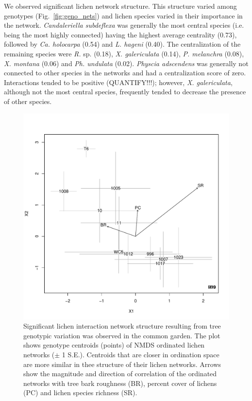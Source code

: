 \documentclass[9pt,twocolumn,twoside,lineno]{pnas-new}
\begin{document}
{We observed significant lichen network structure. This structure
varied among genotypes (Fig.~\ref{fig:geno_nets}) and lichen species
varied in their importance in the network. \textit{Candaleriella
  subdeflexa} was generally the most central species (i.e. being the
most highly connected) having the highest average centrality (0.73),
followed by \textit{Ca. holocarpa} (0.54) and \textit{L. hageni}
(0.40). The centralization of the remaining species were \textit{R.}
sp. (0.18), \textit{X. galericulata} (0.14), \textit{P. melanchra}
(0.08), \textit{X. montana} (0.06) and \textit{Ph. undulata}
(0.02). \textit{Physcia adscendens} was generally not connected to
other species in the networks and had a centralization score of
zero. Interactions tended to be positive (QUANTIFY!!!); however,
\textit{X. galericulata}, although not the most central species,
frequently tended to decrease the presence of other species. 

\begin{figure}[ht]
\centering
\includegraphics[width=\linewidth]{cn_chplot.pdf}
\caption{Significant lichen interaction network structure resulting
  from tree genotypic variation was observed in the common garden.
  The plot shows genotype centroids (points) of NMDS ordinated lichen
  networks ($\pm$ 1 S.E.). Centroids that are closer in ordination
  space are more similar in thee structure of their lichen
  networks. Arrows show the magnitude and direction of correlation of
  the ordinated networks with tree bark roughness (BR), percent cover
  of lichens (PC) and lichen species richness (SR).}
\label{fig:cn_ch_plot}
\end{figure}


}
\end{document}
